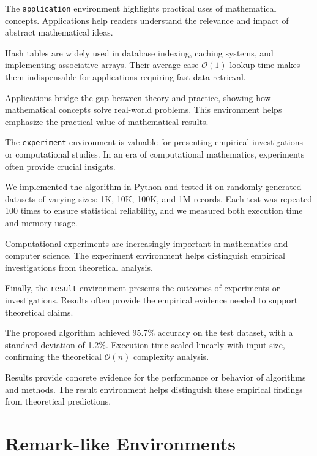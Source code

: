 \documentclass[9pt]{amsart}
\begin{document}
The \texttt{application} environment highlights practical uses of mathematical
concepts. Applications help readers understand the relevance and impact of
abstract mathematical ideas.

\begin{application}
	Hash tables are widely used in database indexing, caching systems, and implementing associative arrays. Their average-case $\mathcal{O}(1)$ lookup time makes them indispensable for applications requiring fast data retrieval.
\end{application}

Applications bridge the gap between theory and practice, showing how
mathematical concepts solve real-world problems. This environment helps
emphasize the practical value of mathematical results.

The \texttt{experiment} environment is valuable for presenting empirical
investigations or computational studies. In an era of computational
mathematics, experiments often provide crucial insights.

\begin{experiment}
	We implemented the algorithm in Python and tested it on randomly generated datasets of varying sizes: 1K, 10K, 100K, and 1M records. Each test was repeated 100 times to ensure statistical reliability, and we measured both execution time and memory usage.
\end{experiment}

Computational experiments are increasingly important in mathematics and
computer science. The experiment environment helps distinguish empirical
investigations from theoretical analysis.

Finally, the \texttt{result} environment presents the outcomes of experiments
or investigations. Results often provide the empirical evidence needed to
support theoretical claims.

\begin{result}
	The proposed algorithm achieved 95.7\% accuracy on the test dataset, with a standard deviation of 1.2\%. Execution time scaled linearly with input size, confirming the theoretical $\mathcal{O}(n)$ complexity analysis.
\end{result}

Results provide concrete evidence for the performance or behavior of algorithms
and methods. The result environment helps distinguish these empirical findings
from theoretical predictions.

\section{Remark-like Environments}
\end{document}
